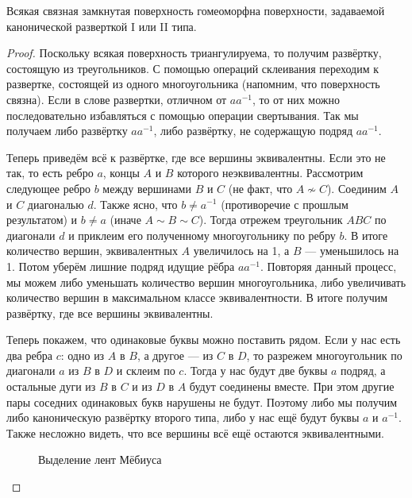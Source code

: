 \documentclass[12pt,a4paper]{article}
\begin{document}
    \begin{theorem}
        Всякая связная замкнутая поверхность гомеоморфна поверхности, задаваемой канонической разверткой I или II типа.
    \end{theorem}

    \begin{proof}
        Поскольку всякая поверхность триангулируема, то получим развёртку, состоящую из треугольников. С помощью операций склеивания переходим к развертке, состоящей из одного многоугольника (напомним, что поверхность связна). Если в слове развертки, отличном от $aa^{-1}$, то от них можно последовательно избавляться с помощью операции свертывания. Так мы получаем либо развёртку $aa^{-1}$, либо развёртку, не содержащую подряд $aa^{-1}$.

        Теперь приведём всё к развёртке, где все вершины эквивалентны. Если это не так, то есть ребро $a$, концы $A$ и $B$ которого неэквивалентны. Рассмотрим следующее ребро $b$ между вершинами $B$ и $C$ (не факт, что $A \nsim C$). Соединим $A$ и $C$ диагональю $d$. Также ясно, что $b \neq a^{-1}$ (противоречие с прошлым результатом) и $b \neq a$ (иначе $A \sim B \sim C$). Тогда отрежем треугольник $ABC$ по диагонали $d$ и приклеим его полученному многоугольнику по ребру $b$. В итоге количество вершин, эквивалентных $A$ увеличилось на 1, а $B$ --- уменьшилось на 1. Потом уберём лишние подряд идущие рёбра $aa^{-1}$. Повторяя данный процесс, мы можем либо уменьшать количество вершин многоугольника, либо увеличивать количество вершин в максимальном классе эквивалентности. В итоге получим развёртку, где все вершины эквивалентны.

        Теперь покажем, что одинаковые буквы можно поставить рядом. Если у нас есть два ребра $c$: одно из $A$ в $B$, а другое --- из $C$ в $D$, то разрежем многоугольник по диагонали $a$ из $B$ в $D$ и склеим по $c$. Тогда у нас будут две буквы $a$ подряд, а остальные дуги из $B$ в $C$ и из $D$ в $A$ будут соединены вместе. При этом другие пары соседних одинаковых букв нарушены не будут. Поэтому либо мы получим либо каноническую развёртку второго типа, либо у нас ещё будут буквы $a$ и $a^{-1}$. Также несложно видеть, что все вершины всё ещё остаются эквивалентными.
        \begin{figure}[h]
            \centering
            \Large
            \caption{Выделение лент Мёбиуса}
            \label{surface_typisation_picture_4}
        \end{figure}


\end{proof}
\end{document}
